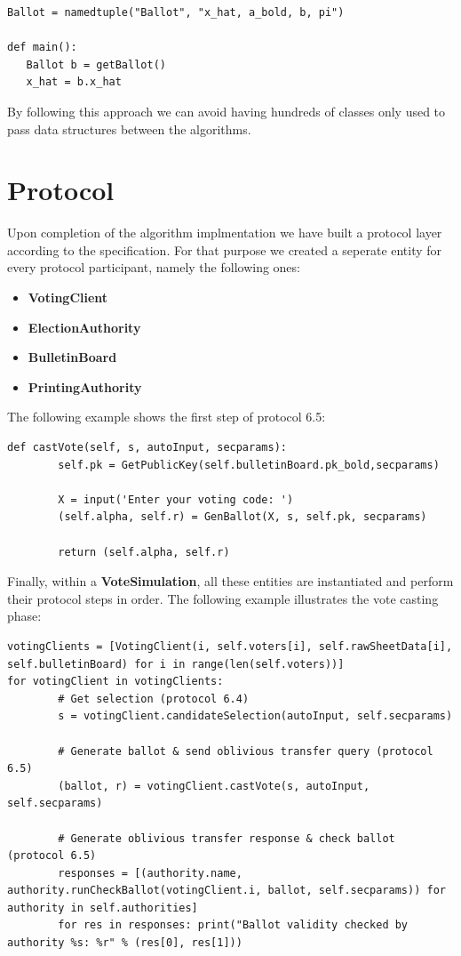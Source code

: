 \documentclass[a4paper,12pt]{report}
\begin{document}
\begin{verbatim}
Ballot = namedtuple("Ballot", "x_hat, a_bold, b, pi")

def main():
   Ballot b = getBallot()
   x_hat = b.x_hat
\end{verbatim}

By following this approach we can avoid having hundreds of classes only used to pass data structures between the algorithms.

\section{Protocol}
Upon completion of the algorithm implmentation we have built a protocol layer according to the specification. For that purpose we created a seperate entity for every protocol participant, namely the following ones:

\begin{itemize}
	\item \textbf{VotingClient}
	\item \textbf{ElectionAuthority}
	\item \textbf{BulletinBoard}
	\item \textbf{PrintingAuthority}
\end{itemize}

The following example shows the first step of protocol 6.5:

\begin{verbatim}
def castVote(self, s, autoInput, secparams):
		self.pk = GetPublicKey(self.bulletinBoard.pk_bold,secparams)

		X = input('Enter your voting code: ')
		(self.alpha, self.r) = GenBallot(X, s, self.pk, secparams)

		return (self.alpha, self.r)
\end{verbatim}

Finally, within a \textbf{VoteSimulation}, all these entities are instantiated and perform their protocol steps in order. The following example illustrates the vote casting phase:

\begin{verbatim}
votingClients = [VotingClient(i, self.voters[i], self.rawSheetData[i], self.bulletinBoard) for i in range(len(self.voters))]
for votingClient in votingClients:
		# Get selection (protocol 6.4)
		s = votingClient.candidateSelection(autoInput, self.secparams)

		# Generate ballot & send oblivious transfer query (protocol 6.5)
		(ballot, r) = votingClient.castVote(s, autoInput, self.secparams)

		# Generate oblivious transfer response & check ballot (protocol 6.5)
		responses = [(authority.name, authority.runCheckBallot(votingClient.i, ballot, self.secparams)) for authority in self.authorities]
		for res in responses: print("Ballot validity checked by authority %s: %r" % (res[0], res[1]))
\end{verbatim}
\end{document}
